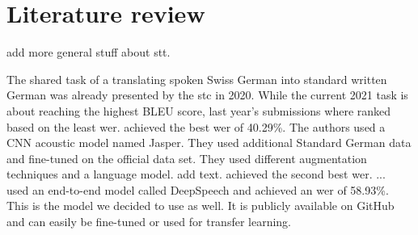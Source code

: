 \section{Literature review}
add more general stuff about \gls{stt}.

The shared task of a translating spoken Swiss German into standard written German was already presented by the \gls{stc} in 2020. While the current 2021 task is about reaching the highest BLEU score, last year's submissions where ranked based on the least \gls{wer}. \citet{buechi2020} achieved the best \gls{wer} of 40.29\%. The authors used a CNN acoustic model named Jasper. They used additional Standard German data and fine-tuned on the official data set. They used different augmentation techniques and a language model. \citet{pluss2020} add text. \cite{Kew2020} achieved the second best \gls{wer}. ... \\
\citet{agarwal2020} used an end-to-end model called DeepSpeech and achieved an \gls{wer} of 58.93\%. This is the model we decided to use as well. It is publicly available on GitHub and can easily be fine-tuned or used for transfer learning. 
